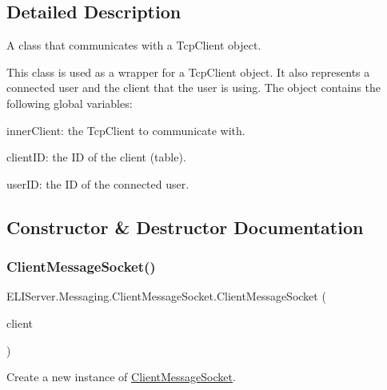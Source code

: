 \subsection{Detailed Description}


A class that communicates with a Tcp\+Client object.

This class is used as a wrapper for a Tcp\+Client object. It also represents a connected user and the client that the user is using. The object contains the following global variables\+:
\begin{DoxyItemize}
\item inner\+Client\+: the Tcp\+Client to communicate with.
\item client\+ID\+: the ID of the client (table).
\item user\+ID\+: the ID of the connected user. 
\end{DoxyItemize}

\subsection{Constructor \& Destructor Documentation}
\mbox{\label{class_e_l_i_server_1_1_messaging_1_1_client_message_socket_ae2c5fabcf44e180e767e22dbbe797174}} 
\subsubsection{\texorpdfstring{Client\+Message\+Socket()}{ClientMessageSocket()}}
{\footnotesize\ttfamily E\+L\+I\+Server.\+Messaging.\+Client\+Message\+Socket.\+Client\+Message\+Socket (\begin{DoxyParamCaption}\item[{Tcp\+Client}]{client }\end{DoxyParamCaption})\hspace{0.3cm}{\ttfamily [inline]}}





Create a new instance of \hyperlink{class_e_l_i_server_1_1_messaging_1_1_client_message_socket}{Client\+Message\+Socket}.

